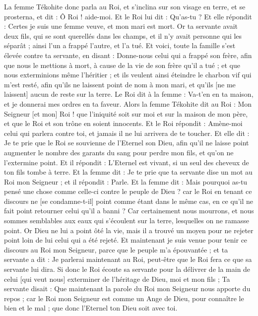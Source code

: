 \begin{multicols}{2}
La femme Tékohite donc parla au Roi, et s'inclina sur son visage en terre, et se prosterna, et dit : Ô Roi ! aide-moi.
Et le Roi lui dit : Qu'as-tu ? Et elle répondit : Certes je suis une femme veuve, et mon mari est mort.
Or ta servante avait deux fils, qui se sont querellés dans les champs, et il n'y avait personne qui les séparât ; ainsi l'un a frappé l'autre, et l'a tué.
Et voici, toute la famille s'est élevée contre ta servante, en disant : Donne-nous celui qui a frappé son frère, afin que nous le mettions à mort, à cause de la vie de son frère qu'il a tué ; et que nous exterminions même l'héritier ; et ils veulent ainsi éteindre le charbon vif qui m'est resté, afin qu'ils ne laissent point de nom à mon mari, et qu'ils [ne me laissent] aucun de reste sur la terre.
Le Roi dit à la femme : Va-t'en en ta maison, et je donnerai mes ordres en ta faveur.
Alors la femme Tékohite dit au Roi : Mon Seigneur [et mon] Roi ! que l'iniquité soit sur moi et sur la maison de mon père, et que le Roi et son trône en soient innocents.
Et le Roi répondit : Amène-moi celui qui parlera contre toi, et jamais il ne lui arrivera de te toucher.
Et elle dit : Je te prie que le Roi se souvienne de l'Eternel son Dieu, afin qu'il ne laisse point augmenter le nombre des garants du sang pour perdre mon fils, et qu'on ne l'extermine point. Et il répondit : L'Eternel est vivant, si un seul des cheveux de ton fils tombe à terre.
Et la femme dit : Je te prie que ta servante dise un mot au Roi mon Seigneur ; et il répondit : Parle.
Et la femme dit : Mais pourquoi as-tu pensé une chose comme celle-ci contre le peuple de Dieu ? car le Roi en tenant ce discours ne [se condamne-t-il] point comme étant dans le même cas, en ce qu'il ne fait point retourner celui qu'il a banni ?
Car certainement nous mourrons, et nous sommes semblables aux eaux qui s'écoulent sur la terre, lesquelles on ne ramasse point. Or Dieu ne lui a point ôté la vie, mais il a trouvé un moyen pour ne rejeter point loin de lui celui qui a été rejeté.
Et maintenant je suis venue pour tenir ce discours au Roi mon Seigneur, parce que le peuple m'a épouvantée ; et ta servante a dit : Je parlerai maintenant au Roi, peut-être que le Roi fera ce que sa servante lui dira.
Si donc le Roi écoute sa servante pour la délivrer de la main de celui [qui veut nous] exterminer de l'héritage de Dieu, moi et mon fils ;
Ta servante disait : Que maintenant la parole du Roi mon Seigneur nous apporte du repos ; car le Roi mon Seigneur est comme un Ange de Dieu, pour connaître le bien et le mal ; que donc l'Eternel ton Dieu soit avec toi.

\end{multicols}
